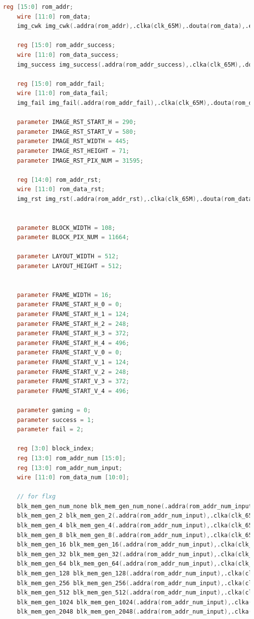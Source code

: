\documentclass[UTF8]{article}
\begin{document}
\begin{lstlisting}[language=Verilog]
	reg [15:0] rom_addr;
	wire [11:0] rom_data;
	img_cwk img_cwk(.addra(rom_addr),.clka(clk_65M),.douta(rom_data),.ena(1'b1));
	
	reg [15:0] rom_addr_success;
	wire [11:0] rom_data_success;
	img_success img_success(.addra(rom_addr_success),.clka(clk_65M),.douta(rom_data_success),.ena(1'b1));
	
	reg [15:0] rom_addr_fail;
	wire [11:0] rom_data_fail;
	img_fail img_fail(.addra(rom_addr_fail),.clka(clk_65M),.douta(rom_data_fail),.ena(1'b1));
	
	parameter IMAGE_RST_START_H = 290;
	parameter IMAGE_RST_START_V = 580;
	parameter IMAGE_RST_WIDTH = 445;
	parameter IMAGE_RST_HEIGHT = 71;
	parameter IMAGE_RST_PIX_NUM = 31595;
	
	reg [14:0] rom_addr_rst;
	wire [11:0] rom_data_rst;
	img_rst img_rst(.addra(rom_addr_rst),.clka(clk_65M),.douta(rom_data_rst),.ena(1'b1));
	
	
	parameter BLOCK_WIDTH = 108;
	parameter BLOCK_PIX_NUM = 11664;
	
	parameter LAYOUT_WIDTH = 512;
	parameter LAYOUT_HEIGHT = 512;
	
	
	parameter FRAME_WIDTH = 16;
	parameter FRAME_START_H_0 = 0;
	parameter FRAME_START_H_1 = 124;
	parameter FRAME_START_H_2 = 248;
	parameter FRAME_START_H_3 = 372;
	parameter FRAME_START_H_4 = 496;
	parameter FRAME_START_V_0 = 0;
	parameter FRAME_START_V_1 = 124;
	parameter FRAME_START_V_2 = 248;
	parameter FRAME_START_V_3 = 372;
	parameter FRAME_START_V_4 = 496;
	
	parameter gaming = 0;
	parameter success = 1;
	parameter fail = 2;
	
	reg [3:0] block_index;
	reg [13:0] rom_addr_num [15:0];
	reg [13:0] rom_addr_num_input;
	wire [11:0] rom_data_num [10:0];
	
	// for flxg
	blk_mem_gen_num_none blk_mem_gen_num_none(.addra(rom_addr_num_input),.clka(clk_65M),.douta(rom_data_num[0]),.ena(1'b1));
	blk_mem_gen_2 blk_mem_gen_2(.addra(rom_addr_num_input),.clka(clk_65M),.douta(rom_data_num[1]),.ena(1'b1));
	blk_mem_gen_4 blk_mem_gen_4(.addra(rom_addr_num_input),.clka(clk_65M),.douta(rom_data_num[2]),.ena(1'b1));
	blk_mem_gen_8 blk_mem_gen_8(.addra(rom_addr_num_input),.clka(clk_65M),.douta(rom_data_num[3]),.ena(1'b1));
	blk_mem_gen_16 blk_mem_gen_16(.addra(rom_addr_num_input),.clka(clk_65M),.douta(rom_data_num[4]),.ena(1'b1));
	blk_mem_gen_32 blk_mem_gen_32(.addra(rom_addr_num_input),.clka(clk_65M),.douta(rom_data_num[5]),.ena(1'b1));
	blk_mem_gen_64 blk_mem_gen_64(.addra(rom_addr_num_input),.clka(clk_65M),.douta(rom_data_num[6]),.ena(1'b1));
	blk_mem_gen_128 blk_mem_gen_128(.addra(rom_addr_num_input),.clka(clk_65M),.douta(rom_data_num[7]),.ena(1'b1));
	blk_mem_gen_256 blk_mem_gen_256(.addra(rom_addr_num_input),.clka(clk_65M),.douta(rom_data_num[8]),.ena(1'b1));
	blk_mem_gen_512 blk_mem_gen_512(.addra(rom_addr_num_input),.clka(clk_65M),.douta(rom_data_num[9]),.ena(1'b1));
	blk_mem_gen_1024 blk_mem_gen_1024(.addra(rom_addr_num_input),.clka(clk_65M),.douta(rom_data_num[10]),.ena(1'b1));
	blk_mem_gen_2048 blk_mem_gen_2048(.addra(rom_addr_num_input),.clka(clk_65M),.douta(rom_data_num[11]),.ena(1'b1));
	

\end{lstlisting}
\end{document}
